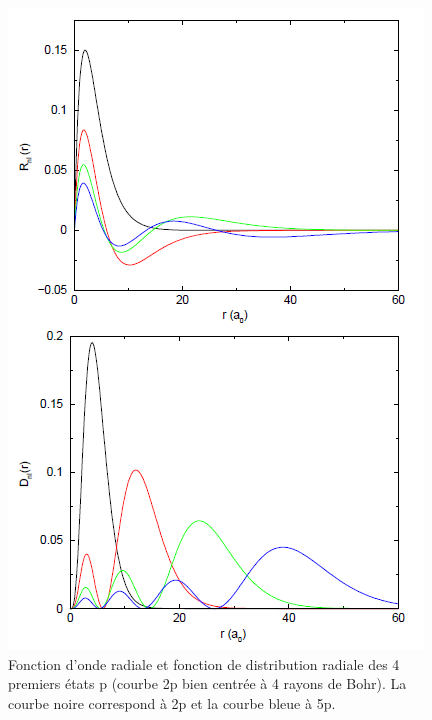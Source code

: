 \begin{figure}[htp]
    \centering
    \includegraphics{Images2/p.PNG}
    \caption{Fonction d'onde radiale et fonction de distribution radiale des 4 premiers états p (courbe 2p bien centrée à 4 rayons de Bohr). La courbe noire correspond à 2p et la courbe bleue à 5p.}
    \label{fig:fcx_rad_2}
\end{figure}

